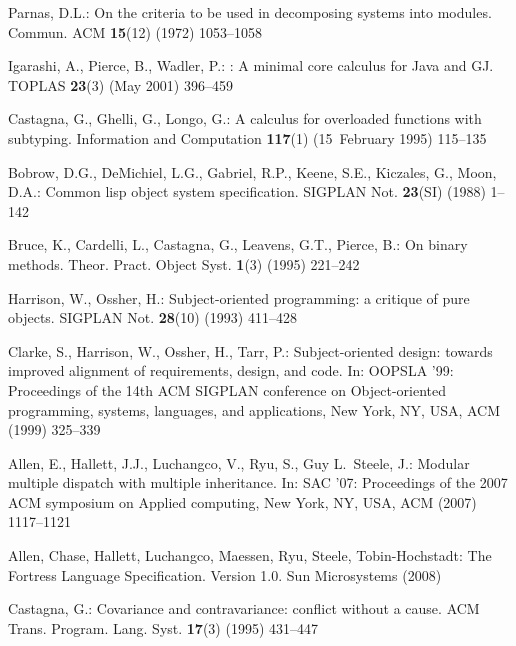 \documentclass[11pt]{article}
\begin{document}
\begin{thebibliography}{10}

Parnas, D.L.:
\newblock On the criteria to be used in decomposing systems into modules.
\newblock Commun. ACM \textbf{15}(12) (1972)  1053--1058

Igarashi, A., Pierce, B., Wadler, P.:
: {A} minimal core calculus for {Java} and {GJ}.
\newblock TOPLAS \textbf{23}(3) (May 2001)  396--459

Castagna, G., Ghelli, G., Longo, G.:
\newblock A calculus for overloaded functions with subtyping.
\newblock Information and Computation \textbf{117}(1) (15~February 1995)
  115--135

Bobrow, D.G., DeMichiel, L.G., Gabriel, R.P., Keene, S.E., Kiczales, G., Moon,
  D.A.:
\newblock Common lisp object system specification.
\newblock SIGPLAN Not. \textbf{23}(SI) (1988)  1--142

Bruce, K., Cardelli, L., Castagna, G., Leavens, G.T., Pierce, B.:
\newblock On binary methods.
\newblock Theor. Pract. Object Syst. \textbf{1}(3) (1995)  221--242

Harrison, W., Ossher, H.:
\newblock Subject-oriented programming: a critique of pure objects.
\newblock SIGPLAN Not. \textbf{28}(10) (1993)  411--428

Clarke, S., Harrison, W., Ossher, H., Tarr, P.:
\newblock Subject-oriented design: towards improved alignment of requirements,
  design, and code.
\newblock In: OOPSLA '99: Proceedings of the 14th ACM SIGPLAN conference on
  Object-oriented programming, systems, languages, and applications, New York,
  NY, USA, ACM (1999)  325--339

Allen, E., Hallett, J.J., Luchangco, V., Ryu, S., Guy L.~Steele, J.:
\newblock Modular multiple dispatch with multiple inheritance.
\newblock In: SAC '07: Proceedings of the 2007 ACM symposium on Applied
  computing, New York, NY, USA, ACM (2007)  1117--1121

Allen, Chase, Hallett, Luchangco, Maessen, Ryu, Steele, Tobin-Hochstadt:
\newblock The Fortress Language Specification. Version 1.0.
\newblock Sun Microsystems (2008)

Castagna, G.:
\newblock Covariance and contravariance: conflict without a cause.
\newblock ACM Trans. Program. Lang. Syst. \textbf{17}(3) (1995)  431--447


\end{thebibliography}
\end{document}
